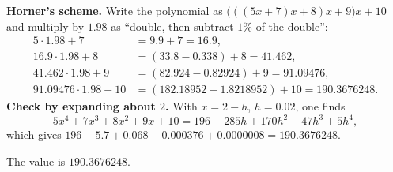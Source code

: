\textbf{Horner's scheme.} Write the polynomial as $\bigl(((5x+7)x+8)x+9\bigr)x+10$ and multiply by $1.98$ as ``double, then subtract $1\%$ of the double'':
\begin{align*}
5\cdot1.98+7&=9.9+7=16.9,\\
16.9\cdot1.98+8&=(33.8-0.338)+8=41.462,\\
41.462\cdot1.98+9&=(82.924-0.82924)+9=91.09476,\\
91.09476\cdot1.98+10&=(182.18952-1.8218952)+10=190.3676248 .
\end{align*}
\textbf{Check by expanding about $2$.} With $x=2-h$, $h=0.02$, one finds
\[
5x^4+7x^3+8x^2+9x+10=196-285h+170h^2-47h^3+5h^4,
\]
which gives $196-5.7+0.068-0.000376+0.0000008=190.3676248$.

The value is $\boxed{190.3676248}$.
